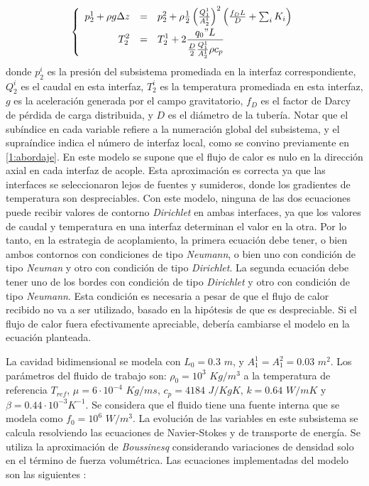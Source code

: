 \begin{equation}
\left\{ \begin{array}{rcl}
p_2^1 + \rho g \Delta z &=& p_2^2 + \rho \frac{1}{2} \left( \frac{Q_1^1}{A_2^1} \right)^2  \left( \frac {f_D L} {D} + \sum_i K_i \right) \\ [0.2cm]
\displaystyle T_2^2 &=& \displaystyle T_2^1 + 2 \frac {q_0" L}{\frac{D}{2} \frac{Q_1^1}{A_2^1}\rho c_p}
\label{eq-intercambiador}
\end{array}
\right.
\end{equation}
donde $p_2^i$ es la presión del subsistema promediada en la interfaz correspondiente,
$Q_2^i$ es el caudal en esta interfaz,
$T_2^i$ es la temperatura promediada en esta interfaz,
$g$ es la aceleración generada por el campo gravitatorio,
$f_D$ es el factor de Darcy de pérdida de carga distribuida,
y $D$ es el diámetro de la tubería.
Notar que el subíndice en cada variable refiere a la numeración global del subsistema, y el supraíndice indica el número de interfaz local,
como se convino previamente en \ref{1:abordaje}.
En este modelo se supone que el flujo de calor es nulo en la dirección axial en cada interfaz de acople.
Esta aproximación es correcta ya que las interfaces se seleccionaron lejos de fuentes y sumideros, donde los gradientes de temperatura son despreciables.
Con este modelo, ninguna de las dos ecuaciones puede recibir valores de contorno \textit{Dirichlet} en ambas interfaces,
ya que los valores de caudal y temperatura en una interfaz determinan el valor en la otra.
Por lo tanto, en la estrategia de acoplamiento, la primera ecuación debe tener, o bien ambos contornos con condiciones de tipo \textit{Neumann}, 
o bien uno con condición de tipo \textit{Neuman} y otro con condición de tipo \textit{Dirichlet}.
La segunda ecuación debe tener uno de los bordes con condición de tipo \textit{Dirichlet} y otro con condición de tipo \textit{Neumann}.
Esta condición es necesaria a pesar de que el flujo de calor recibido no va a ser utilizado, basado en la hipótesis de que es despreciable.
Si el flujo de calor fuera efectivamente apreciable, debería cambiarse el modelo en la ecuación planteada.

La cavidad bidimensional se modela con $L_0=0.3$ $m$, y $A_1^1=A_1^2=0.03$ $m^2$.
Los parámetros del fluido de trabajo son: $\rho_0=10^3$ $Kg/m^3$ a la temperatura de referencia $T_{ref}$,
$\mu=6\cdot 10^{-4}$ $Kg/ms$, $c_p=4184$ $J/KgK$, 
$k=0.64$ $W/mK$ y $\beta=0.44\cdot10^{-3}K^{-1}$.
Se considera que el fluido tiene una fuente interna que se modela como $f_0=10^6$ $W/m^3$.
La evolución de las variables en este subsistema se calcula resolviendo las ecuaciones de Navier-Stokes 
y de transporte de energía.
Se utiliza la aproximación de \textit{Boussinesq} considerando variaciones de densidad solo en el término de fuerza volumétrica.
Las ecuaciones implementadas del modelo son las siguientes \cite{gunzburger} \cite{kays}:

